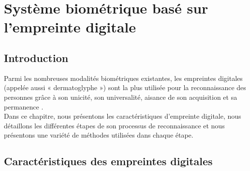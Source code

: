 \chapter{Système biométrique basé sur l’empreinte digitale}
\label{Chapter2} %

\section{Introduction}
Parmi les nombreuses modalités biométriques existantes, les empreintes digitales (appelée aussi « dermatoglyphe ») sont la plus utilisée pour la reconnaissance des personnes grâce à son unicité, son universalité, aisance de son acquisition et sa permanence \citep{maltoni2009handbook}.\\
Dans ce chapitre, nous présentons les caractéristiques d'empreinte digitale, nous détaillons les différentes étapes de son processus de reconnaissance et nous présentons une variété de méthodes utilisées dans chaque étape.
\section{Caractéristiques des empreintes digitales}

